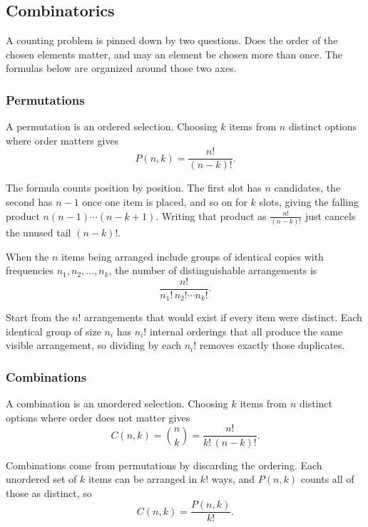 \subsection{Combinatorics}

A counting problem is pinned down by two questions. Does the order of the chosen elements matter, and may an element be chosen more than once. The formulas below are organized around those two axes.

\subsubsection{Permutations}

\begin{definition}[Permutation]
A permutation is an ordered selection. Choosing $k$ items from $n$ distinct options where order matters gives
\[
P(n, k) = \frac{n!}{(n-k)!}.
\]
\end{definition}

The formula counts position by position. The first slot has $n$ candidates, the second has $n-1$ once one item is placed, and so on for $k$ slots, giving the falling product $n(n-1)\cdots(n-k+1)$. Writing that product as $\frac{n!}{(n-k)!}$ just cancels the unused tail $(n-k)!$.

\begin{definition}
When the $n$ items being arranged include groups of identical copies with frequencies $n_1, n_2, \dots, n_k$, the number of distinguishable arrangements is
\[
\frac{n!}{n_1!\, n_2! \cdots n_k!}.
\]
\end{definition}

Start from the $n!$ arrangements that would exist if every item were distinct. Each identical group of size $n_i$ has $n_i!$ internal orderings that all produce the same visible arrangement, so dividing by each $n_i!$ removes exactly those duplicates.

\subsubsection{Combinations}

\begin{definition}[Combination]
A combination is an unordered selection. Choosing $k$ items from $n$ distinct options where order does not matter gives
\[
C(n,k) = \binom{n}{k} = \frac{n!}{k!\,(n-k)!}.
\]
\end{definition}

Combinations come from permutations by discarding the ordering. Each unordered set of $k$ items can be arranged in $k!$ ways, and $P(n,k)$ counts all of those as distinct, so
\[
C(n,k) = \frac{P(n,k)}{k!}.
\]

